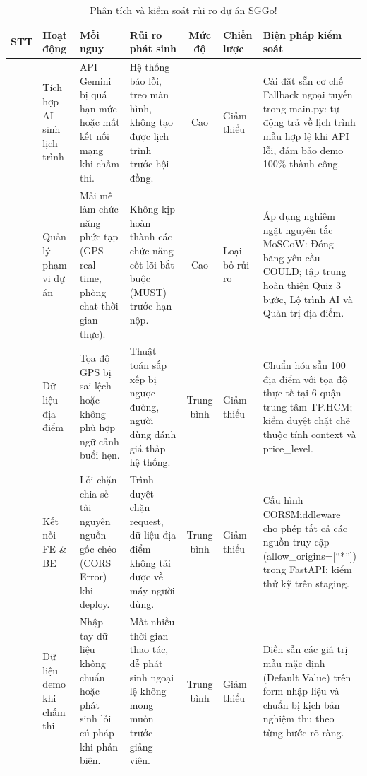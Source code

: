 \documentclass[13pt,a4paper]{extreport}
\newcommand{\hd}[1]{\centering\arraybackslash\textbf{#1}}
\begin{document}
\begin{table}[H]
\centering
\caption{Phân tích và kiểm soát rủi ro dự án SGGo!}
\label{tab:quan_ly_rui_ro}
\setlength{\tabcolsep}{3pt}
\begin{tabular}{|>{\raggedright\arraybackslash}c|L{2.0cm}|L{2.4cm}|L{2.4cm}|>{\raggedright\arraybackslash}c|L{1.5cm}|L{3.8cm}|}
\hline
\hd{STT} & \hd{Hoạt động} & \hd{Mối nguy} & \hd{Rủi ro phát sinh} & \hd{Mức độ} & \hd{Chiến lược} & \hd{Biện pháp kiểm soát} \\
 & Tích hợp AI sinh lịch trình & API Gemini bị quá hạn mức hoặc mất kết nối mạng khi chấm thi. & Hệ thống báo lỗi, treo màn hình, không tạo được lịch trình trước hội đồng. & Cao & Giảm thiểu & Cài đặt sẵn cơ chế Fallback ngoại tuyến trong main.py: tự động trả về lịch trình mẫu hợp lệ khi API lỗi, đảm bảo demo 100\% thành công. \\
 & Quản lý phạm vi dự án & Mải mê làm chức năng phức tạp (GPS real-time, phòng chat thời gian thực). & Không kịp hoàn thành các chức năng cốt lõi bắt buộc (MUST) trước hạn nộp. & Cao & Loại bỏ rủi ro & Áp dụng nghiêm ngặt nguyên tắc MoSCoW: Đóng băng yêu cầu COULD; tập trung hoàn thiện Quiz 3 bước, Lộ trình AI và Quản trị địa điểm. \\
 & Dữ liệu địa điểm & Tọa độ GPS bị sai lệch hoặc không phù hợp ngữ cảnh buổi hẹn. & Thuật toán sắp xếp bị ngược đường, người dùng đánh giá thấp hệ thống. & Trung bình & Giảm thiểu & Chuẩn hóa sẵn 100 địa điểm với tọa độ thực tế tại 6 quận trung tâm TP.HCM; kiểm duyệt chặt chẽ thuộc tính context và price\_level. \\
 & Kết nối FE \& BE & Lỗi chặn chia sẻ tài nguyên nguồn gốc chéo (CORS Error) khi deploy. & Trình duyệt chặn request, dữ liệu địa điểm không tải được về máy người dùng. & Trung bình & Giảm thiểu & Cấu hình CORSMiddleware cho phép tất cả các nguồn truy cập (allow\_origins=[``*'']) trong FastAPI; kiểm thử kỹ trên staging. \\
 & Dữ liệu demo khi chấm thi & Nhập tay dữ liệu không chuẩn hoặc phát sinh lỗi cú pháp khi phản biện. & Mất nhiều thời gian thao tác, dễ phát sinh ngoại lệ không mong muốn trước giảng viên. & Trung bình & Giảm thiểu & Điền sẵn các giá trị mẫu mặc định (Default Value) trên form nhập liệu và chuẩn bị kịch bản nghiệm thu theo từng bước rõ ràng. \\
\hline
\end{tabular}
\end{table}
\end{document}
